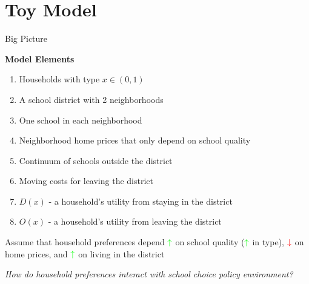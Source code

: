 \documentclass[notes,11pt, aspectratio=169]{beamer}
\newenvironment{wideitemize}{\itemize\addtolength{\itemsep}{10pt}}{\enditemize}
\begin{document}
\section{Toy Model}

\begin{frame}{Big Picture} 
\label{detailsback}
\begin{wideitemize}
\item \textbf{Model Elements}
\begin{enumerate}
\item Households with type $x \in (0,1)$
\item A school district with 2 neighborhoods
\item One school in each neighborhood
\item Neighborhood home prices that only depend on school quality
\item Continuum of schools outside the district
\item Moving costs for leaving the district
\item $D(x)$ - a household's utility from staying in the district
\item $O(x)$ - a household's utility from leaving the district
\end{enumerate}
\item Assume that household preferences depend $\textcolor{green}{\uparrow}$ on school quality ($\textcolor{green}{\uparrow}$ in type), $\textcolor{red}{\downarrow}$ on home prices, and $\textcolor{green}{\uparrow}$ on living in the district
\item \textit{How do household preferences interact with school choice policy environment?}
\end{wideitemize}
\hyperlink{details}{} \hyperlink{location}{} \hyperlink{example}{}
\end{frame}
\end{document}
